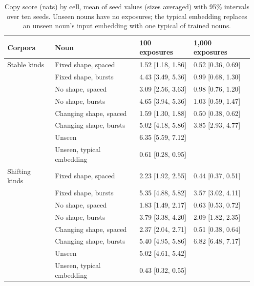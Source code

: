 \begin{table}[!htbp]
\centering\small

\begin{tabular}{@{}llll@{}}
\toprule
Corpora & Noun & 100 exposures & 1,000 exposures \\
\midrule
Stable kinds & Fixed shape, spaced & 1.52 {[}1.18, 1.86{]} & 0.52 {[}0.36, 0.69{]} \\
 & Fixed shape, bursts & 4.43 {[}3.49, 5.36{]} & 0.99 {[}0.68, 1.30{]} \\
 & No shape, spaced & 3.09 {[}2.56, 3.63{]} & 0.98 {[}0.76, 1.20{]} \\
 & No shape, bursts & 4.65 {[}3.94, 5.36{]} & 1.03 {[}0.59, 1.47{]} \\
 & Changing shape, spaced & 1.59 {[}1.30, 1.88{]} & 0.50 {[}0.38, 0.62{]} \\
 & Changing shape, bursts & 5.02 {[}4.18, 5.86{]} & 3.85 {[}2.93, 4.77{]} \\
 & Unseen & 6.35 {[}5.59, 7.12{]} &  \\
 & Unseen, typical embedding & 0.61 {[}0.28, 0.95{]} &  \\
\midrule
Shifting kinds & Fixed shape, spaced & 2.23 {[}1.92, 2.55{]} & 0.44 {[}0.37, 0.51{]} \\
 & Fixed shape, bursts & 5.35 {[}4.88, 5.82{]} & 3.57 {[}3.02, 4.11{]} \\
 & No shape, spaced & 1.83 {[}1.49, 2.17{]} & 0.63 {[}0.53, 0.72{]} \\
 & No shape, bursts & 3.79 {[}3.38, 4.20{]} & 2.09 {[}1.82, 2.35{]} \\
 & Changing shape, spaced & 2.37 {[}2.04, 2.71{]} & 0.51 {[}0.38, 0.64{]} \\
 & Changing shape, bursts & 5.40 {[}4.95, 5.86{]} & 6.82 {[}6.48, 7.17{]} \\
 & Unseen & 5.02 {[}4.61, 5.42{]} &  \\
 & Unseen, typical embedding & 0.43 {[}0.32, 0.55{]} &  \\
\bottomrule
\end{tabular}
\caption{Copy score (nats) by cell, mean of seed values (sizes averaged) with 95\% intervals over ten seeds. Unseen nouns have no exposures; the typical embedding replaces an unseen noun's input embedding with one typical of trained nouns.}
\label{tab:N2}
\end{table}

